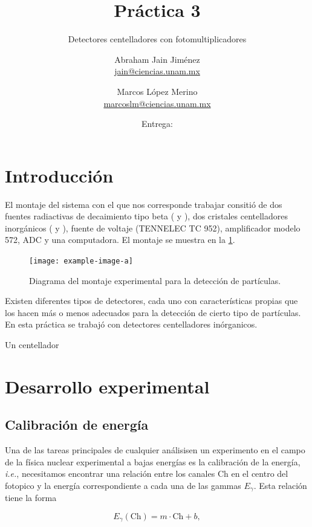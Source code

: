 \documentclass[12pt]{article}
\title{Práctica 3}
\subtitle{Detectores centelladores con fotomultiplicadores}
\author{%
    Abraham Jain Jiménez \\ \href{mailto:jain@ciencias.unam.mx}{\footnotesize jain@ciencias.unam.mx}
  \and Marcos López Merino \\ \href{mailto:marcoslm@ciencias.unam.mx}{\footnotesize marcoslm@ciencias.unam.mx}
}%
\date{Entrega: \DTMusedate{duedate}}
\newcommand{\idest}{\emph{i.e.},\xspace} %
\begin{document}
    \maketitle
    \thispagestyle{fancy}
    \begin{abstract}
        \kant[1]
    \end{abstract}

    \section*{Introducción}
        El montaje del sistema con el que nos corresponde trabajar consitió de dos fuentes radiactivas de decaimiento tipo beta ( y ), dos cristales centelladores inorgánicos ( y ), fuente de voltaje (TENNELEC TC 952), amplificador modelo 572\cite{Amplifier572}, ADC\cite{USC30ADC} y una computadora. El montaje se muestra en la \cref{fig:montaje}.

        \begin{figure}[htb]
            \centering
            \texttt{[image: example-image-a]}
            \caption{Diagrama del montaje experimental para la detección de partículas.}
            \label{fig:montaje}
        \end{figure}

        Existen diferentes tipos de detectores, cada uno con características propias que los hacen más o menos adecuados para la detección de cierto tipo de partículas. En esta práctica se trabajó con detectores centelladores inórganicos.

        Un centellador 
    
    \section*{Desarrollo experimental}
        \subsection*{Calibración de energía}
        Una de las tareas principales de cualquier análisisen un experimento en el campo de la física nuclear experimental a bajas energías es la calibración de la energía, \idest necesitamos encontrar una relación entre los canales \(\text{Ch}\) en el centro del fotopico y la energía correspondiente a cada una de las gammas \(E_{\gamma}\). Esta relación tiene la forma

        \begin{equation}
            E_{\gamma}(\text{Ch}) = m \cdot \text{Ch} + b,
            \label{eq:linear_model}
        \end{equation}
\end{document}
